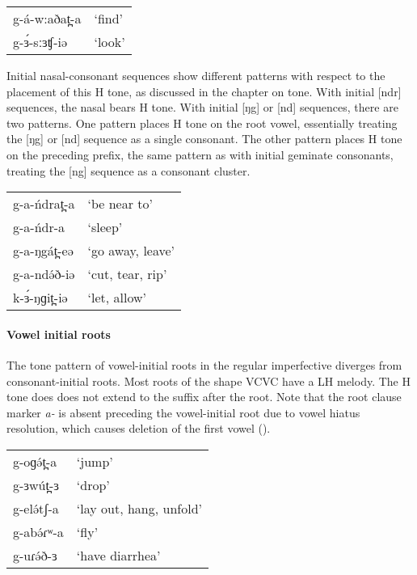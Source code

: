 \ea 
\begin{tabular}[t]{ll}
g-á-w:aðat̪-a	&	`find' \\ 
g-ɜ́-sːɜʧ-iə		&	`look'\\	
\end{tabular}
\z 


Initial nasal-consonant sequences show different patterns with respect to the placement of this H tone, as discussed in the chapter on tone. With initial [ndr] sequences, the nasal bears H tone. With initial [ŋg] or [nd] sequences, there are two patterns. One pattern places H tone on the root vowel, essentially treating the [ŋg] or [nd] sequence as a single consonant. The other pattern places H tone on the preceding prefix, the same pattern as with initial geminate consonants, treating the [ng] sequence as a consonant cluster. %

\ea 
\begin{tabular}[t]{ll}
g-a-ńdrat̪-a	&	`be near to'\\
g-a-ńdr-a	&	`sleep'\\
g-a-ŋgát̪-eə	&	`go away, leave'\\
g-a-ndə́ð-iə	&	`cut, tear, rip'\\
k-ɜ́-ŋɡit̪-iə	&	`let, allow'\\	
\end{tabular}
\z 

\paragraph{Vowel initial roots} \label{sec:ch11:vcipfv} The tone pattern of vowel-initial roots in the regular imperfective diverges from consonant-initial roots. Most roots of the shape VCVC have a LH melody. The H tone does does not extend to the suffix after the root. Note that the root clause marker \textit{a-} is absent preceding the vowel-initial root due to vowel hiatus resolution, which causes deletion of the first vowel ().

\ea 
\begin{tabular}[t]{ll}
g-oɡə́t̪-a		&	‘jump’\\
g-ɜwút̪-ɜ	&	‘drop’\\
g-elə́tʃ-a	&	`lay out, hang, unfold'\\
g-abə́ɾʷ-a	&	`fly'\\
g-uɾə́ð-ɜ		&	`have diarrhea'\\	
\end{tabular}
\z 

